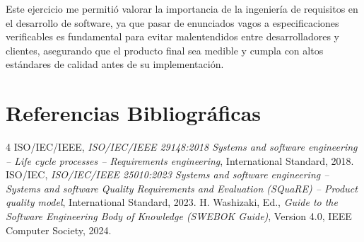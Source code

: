 \documentclass[11pt,a4paper]{article}
\begin{document}
Este ejercicio me permitió valorar la importancia de la ingeniería de requisitos en el desarrollo de software, ya que pasar de enunciados vagos a especificaciones verificables es fundamental para evitar malentendidos entre desarrolladores y clientes, asegurando que el producto final sea medible y cumpla con altos estándares de calidad antes de su implementación.

\section{Referencias Bibliográficas}
\begin{thebibliography}{4}
 ISO/IEC/IEEE, \emph{ISO/IEC/IEEE 29148:2018 Systems and software engineering -- Life cycle processes -- Requirements engineering}, International Standard, 2018.
 ISO/IEC, \emph{ISO/IEC/IEEE 25010:2023 Systems and software engineering -- Systems and software Quality Requirements and Evaluation (SQuaRE) -- Product quality model}, International Standard, 2023.
 H. Washizaki, Ed., \emph{Guide to the Software Engineering Body of Knowledge (SWEBOK Guide)}, Version 4.0, IEEE Computer Society, 2024.
\end{thebibliography}
\end{document}
